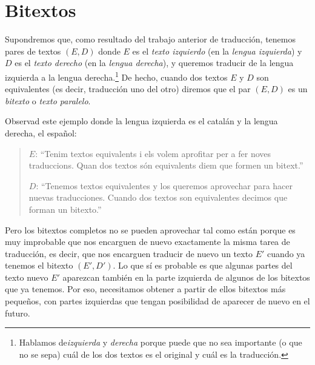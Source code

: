 \section{Bitextos} \label{ss:bitextos} 

Supondremos que, como resultado del trabajo anterior de traducción, tenemos pares de textos $(E,D)$ donde $E$ es el \emph{texto izquierdo} (en la \emph{lengua izquierda}) y $D$ es el \emph{texto derecho} (en la \emph{lengua derecha}), y queremos traducir de la lengua izquierda a la lengua derecha.\footnote{Hablamos de\emph{izquierda} y \emph{derecha} porque puede que no sea importante (o que no se sepa) cuál de los dos textos es el original y cuál es la traducción.} De hecho, cuando dos textos $E$ y $D$ son equivalentes (es decir, traducción uno del otro) diremos que el par $(E,D)$ es un \emph{bitexto} o \emph{texto paralelo}. 

Observad este ejemplo donde la lengua izquierda es el catalán y la lengua derecha, el español: \begin{quote} $E$: ``Tenim textos equivalents i els volem aprofitar per a fer noves traduccions. Quan dos textos són equivalents diem que formen un bitext.'' 

$D$: ``Tenemos textos equivalentes y los queremos aprovechar para hacer nuevas traducciones. Cuando dos textos son equivalentes decimos que forman un bitexto.'' \end{quote} 

Pero los bitextos completos no se pueden aprovechar tal como están porque es muy improbable que nos encarguen de nuevo exactamente la misma tarea de traducción, es decir, que nos encarguen traducir de nuevo un texto $E'$ cuando ya tenemos el bitexto $(E',D')$. Lo que sí es probable es que algunas partes del texto nuevo $E'$ aparezcan también en la parte izquierda de algunos de los bitextos que ya tenemos. Por eso, necesitamos obtener a partir de ellos bitextos más pequeños, con partes izquierdas que tengan posibilidad de aparecer de nuevo en el futuro. 

